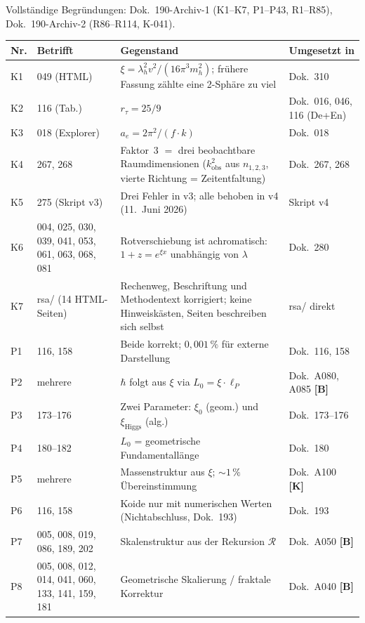 \noindent Vollständige Begründungen: Dok.~190-Archiv-1 (K1–K7, P1–P43, R1–R85),
Dok.~190-Archiv-2 (R86–R114, K-041).

\begingroup\small
\begin{longtable}{@{}p{1.2cm}p{3.4cm}p{5.8cm}p{3.4cm}@{}}
\toprule
\textbf{Nr.} & \textbf{Betrifft} & \textbf{Gegenstand} & \textbf{Umgesetzt in} \\
\midrule\endhead
\bottomrule\endfoot

K1 & 049 (HTML) & $\xi = \lambda_h^2 v^2/(16\pi^3 m_h^2)$; frühere Fassung zählte eine 2-Sphäre zu viel & Dok.~310 \\
K2 & 116 (Tab.) & $r_\tau = 25/9$ & Dok.~016, 046, 116 (De+En) \\
K3 & 018 (Explorer) & $a_e = 2\pi^2/(f \cdot k)$ & Dok.~018 \\
K4 & 267, 268 & Faktor~3 $=$ drei beobachtbare Raumdimensionen ($k_\mathrm{obs}^2$ aus $n_{1,2,3}$, vierte Richtung = Zeitentfaltung) & Dok.~267, 268 \\
K5 & 275 (Skript v3) & Drei Fehler in v3; alle behoben in v4 (11.~Juni 2026) & Skript v4 \\
K6 & 004, 025, 030, 039, 041, 053, 061, 063, 068, 081 & Rotverschiebung ist achromatisch: $1+z=e^{\xi x}$ unabhängig von $\lambda$ & Dok.~280 \\
K7 & rsa/ (14 HTML-Seiten) & Rechenweg, Beschriftung und Methodentext korrigiert; keine Hinweiskästen, Seiten beschreiben sich selbst & rsa/ direkt \\
P1 & 116, 158 & Beide korrekt; $0{,}001\,\%$ für externe Darstellung & Dok.~116, 158 \\
P2 & mehrere & $\hbar$ folgt aus $\xi$ via $L_0 = \xi\cdot\ell_P$ & Dok.~A080, A085 \textbf{[B]} \\
P3 & 173--176 & Zwei Parameter: $\xi_0$ (geom.) und $\xi_{\text{Higgs}}$ (alg.) & Dok.~173--176 \\
P4 & 180--182 & $L_0$ = geometrische Fundamentallänge & Dok.~180 \\
P5 & mehrere & Massenstruktur aus $\xi$; $\sim 1\,\%$ Übereinstimmung & Dok.~A100 \textbf{[K]} \\
P6 & 116, 158 & Koide nur mit numerischen Werten (Nichtabschluss, Dok.~193) & Dok.~193 \\
P7 & 005, 008, 019, 086, 189, 202 & Skalenstruktur aus der Rekursion $\mathcal{R}$ & Dok.~A050 \textbf{[B]} \\
P8 & 005, 008, 012, 014, 041, 060, 133, 141, 159, 181 & Geometrische Skalierung / fraktale Korrektur & Dok.~A040 \textbf{[B]} \\

\end{longtable}
